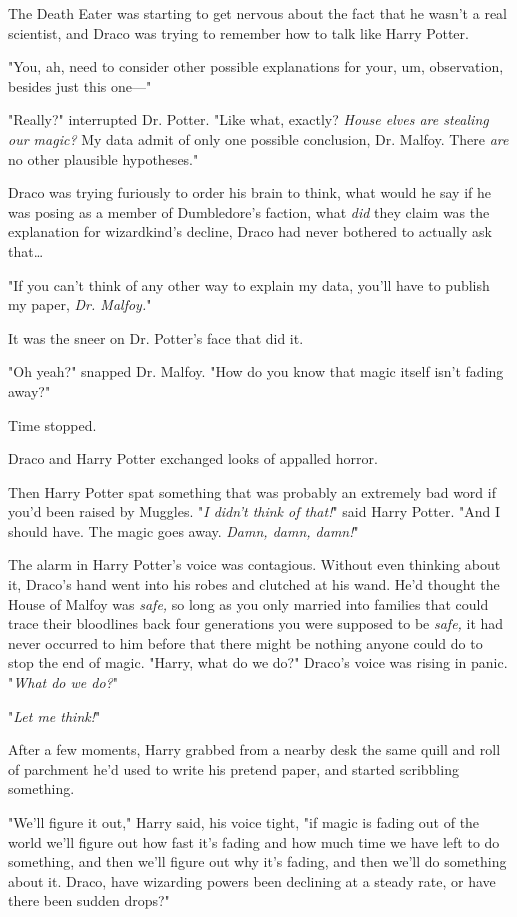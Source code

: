 The Death Eater was starting to get nervous about the fact that he wasn't a
real scientist, and Draco was trying to remember how to talk like Harry Potter.

"You, ah, need to consider other possible explanations for your, um,
observation, besides just this one---"

"Really?" interrupted Dr. Potter. "Like what, exactly? \emph{House elves are
stealing our magic?} My data admit of only one possible conclusion, Dr. Malfoy.
There \emph{are} no other plausible hypotheses."

Draco was trying furiously to order his brain to think, what would he say if he
was posing as a member of Dumbledore's faction, what \emph{did} they claim was
the explanation for wizardkind's decline, Draco had never bothered to actually
ask that{\ldots}

"If you can't think of any other way to explain my data, you'll have to publish
my paper, \emph{Dr. Malfoy.}"

It was the sneer on Dr. Potter's face that did it.

"Oh yeah?" snapped Dr. Malfoy. "How do you know that magic itself isn't fading
away?"

Time stopped.

Draco and Harry Potter exchanged looks of appalled horror.

Then Harry Potter spat something that was probably an extremely bad word if
you'd been raised by Muggles. "\emph{I didn't think of that!}" said Harry
Potter. "And I should have. The magic goes away. \emph{Damn, damn, damn!}"

The alarm in Harry Potter's voice was contagious. Without even thinking about
it, Draco's hand went into his robes and clutched at his wand. He'd thought the
House of Malfoy was \emph{safe,} so long as you only married into families that
could trace their bloodlines back four generations you were supposed to be
\emph{safe,} it had never occurred to him before that there might be nothing
anyone could do to stop the end of magic. "Harry, what do we do?" Draco's voice
was rising in panic. "\emph{What do we do?}"

"\emph{Let me think!}"

After a few moments, Harry grabbed from a nearby desk the same quill and roll
of parchment he'd used to write his pretend paper, and started scribbling
something.

"We'll figure it out," Harry said, his voice tight, "if magic is fading out of
the world we'll figure out how fast it's fading and how much time we have left
to do something, and then we'll figure out why it's fading, and then we'll do
something about it. Draco, have wizarding powers been declining at a steady
rate, or have there been sudden drops?"

